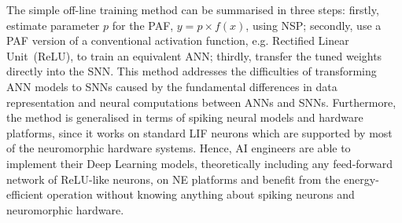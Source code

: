 
The simple off-line training method can be summarised in three steps:
firstly, estimate parameter $p$ for the PAF, $y = p \times f(x)$, using NSP;
secondly, use a PAF version of a conventional activation function, e.g. Rectified Linear Unit~(ReLU), to train an equivalent ANN;
thirdly, transfer the tuned weights directly into the SNN.
This method addresses the difficulties of transforming ANN models to SNNs caused by the fundamental differences in data representation and neural computations between ANNs and SNNs.
Furthermore, the method is generalised in terms of spiking neural models and hardware platforms, since it works on standard LIF neurons which are supported by most of the neuromorphic hardware systems.
Hence, AI engineers are able to implement their Deep Learning models, theoretically including any feed-forward network of ReLU-like neurons, on NE platforms and benefit from the energy-efficient operation without knowing anything about spiking neurons and neuromorphic hardware.  




